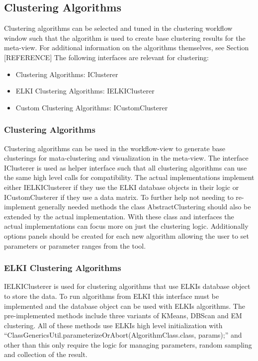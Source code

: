 \documentclass[
	a4paper,
	english,
	twoside,
	openright,               
	11pt                            
	]{report}
\begin{document}
\subsection{Clustering Algorithms}
Clustering algorithms can be selected and tuned in the clustering workflow window such that the algorithm is used to create base clustering results for the meta-view. For additional information on the algorithms themselves, see Section [REFERENCE] The following interfaces are relevant for clustering:

\begin{itemize}
  \item Clustering Algorithms: IClusterer
  \item ELKI Clustering Algorithms: IELKIClusterer
  \item Custom Clustering Algorithms: ICustomClusterer
\end{itemize}

\subsubsection{Clustering Algorithms}
Clustering algorithms can be used in the workflow-view to generate base clusterings for mata-clustering and visualization in the meta-view. The interface IClusterer is used as helper interface such that all clustering algorithms can use the same high level calls for compatibility. The actual implementations implement either IELKIClusterer if they use the ELKI database objects in their logic or ICustomClusterer if they use a data matrix. To further help not needing to re-implement generally needed methods the class AbstractClustering should also be extended by the actual implementation. With these class and interfaces the actual implementations can focus more on just the clustering logic. Additionally options panels should be created for each new algorithm allowing the user to set parameters or parameter ranges from the tool.

\subsubsection{ELKI Clustering Algorithms}
IELKIClusterer is used for clustering algorithms that use ELKIs database object to store the data. To run algorithms from ELKI this interface must be implemented and the database object can be used with ELKIs algorithms. The pre-implemented methods include three variants of KMeans, DBScan and EM clustering. All of these methods use ELKIs high level initialization with ``ClassGenericsUtil.parameterizeOrAbort(AlgorithmClass.class, params);'' and other than this only require the logic for managing parameters, random sampling and collection of the result.
\end{document}
